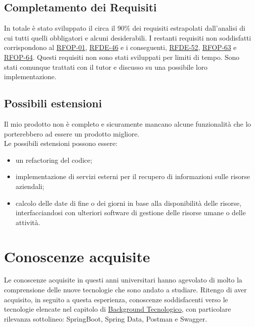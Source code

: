 \subsection{Completamento dei Requisiti}
In totale è stato sviluppato il circa il 90\% dei requisiti estrapolati dall'analisi di cui tutti quelli obbligatori e alcuni desiderabili. I restanti requisiti non soddisfatti corrispondono al \hyperlink{rf01}{RFOP-01}, \hyperlink{rf46}{RFDE-46} e i conseguenti, \hyperlink{rf52}{RFDE-52}, \hyperlink{rf63}{RFOP-63} e \hyperlink{rf64}{RFOP-64}. Questi requisiti non sono stati sviluppati per limiti di tempo. Sono stati comunque trattati con il tutor e discusso su una possibile loro implementazione.

\subsection{Possibili estensioni}
Il mio prodotto non è completo e sicuramente mancano alcune funzionalità che lo porterebbero ad essere un prodotto migliore.\\
Le possibili estensioni possono essere:
\begin{itemize}
\item un refactoring del codice;
\item implementazione di servizi esterni per il recupero di informazioni sulle risorse aziendali;
\item calcolo delle date di fine o dei giorni in base alla disponibilità delle risorse, interfacciandosi con ulteriori software di gestione delle risorse umane o delle attività.
\end{itemize} 

\section{Conoscenze acquisite}
Le conoscenze acquisite in questi anni universitari hanno agevolato di molto la comprensione delle nuove tecnologie che sono andato a studiare. Ritengo di aver acquisito, in seguito a questa esperienza, conoscenze soddisfacenti verso le tecnologie elencate nel capitolo di \hyperlink{tecnologie}{Background Tecnologico}, con particolare rilevanza sottolineo: SpringBoot, Spring Data, Postman e Swagger.

